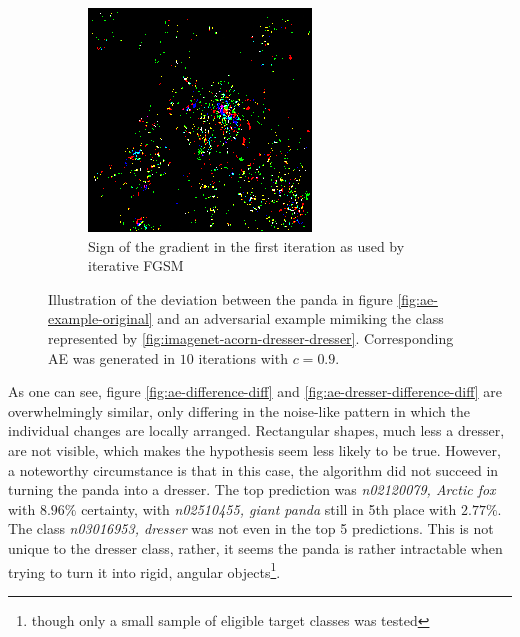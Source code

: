 \documentclass[11pt, a4paper]{article}
\begin{document}
\begin{figure}[h!tb]
\begin{subfigure}[b]{0.45\textwidth}
        \includegraphics[width=\textwidth]{aes_new/panda_dresser_10_0dot9_grad.png}
        \caption{Sign of the gradient in the first iteration as used by iterative FGSM}
        \label{fig:ae-dresser-difference-grad}
    \end{subfigure}
    \caption{Illustration of the deviation between the panda in figure \ref{fig:ae-example-original} and an adversarial example mimiking the class represented by \ref{fig:imagenet-acorn-dresser-dresser}. Corresponding AE was generated in $10$ iterations with $c = 0.9$.}
    \label{fig:ae-dresser-difference}
\end{figure}

As one can see, figure \ref{fig:ae-difference-diff} and \ref{fig:ae-dresser-difference-diff} are overwhelmingly similar, only differing in the noise-like pattern in which the individual changes are locally arranged. Rectangular shapes, much less a dresser, are not visible, which makes the hypothesis seem less likely to be true. However, a noteworthy circumstance is that in this case, the algorithm did not succeed in turning the panda into a dresser. The top prediction was \emph{n02120079, Arctic fox} with $8.96\%$ certainty, with \emph{n02510455, giant panda} still in 5th place with $2.77\%$. The class \emph{n03016953, dresser} was not even in the top 5 predictions. This is not unique to the dresser class, rather, it seems the panda is rather intractable when trying to turn it into rigid, angular objects\footnote{though only a small sample of eligible target classes was tested}.
\end{document}
